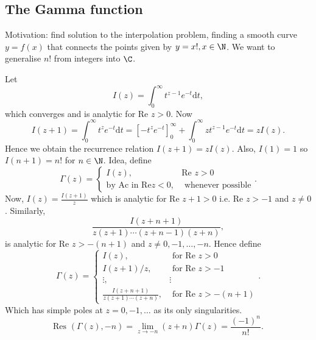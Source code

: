 \documentclass[a4paper]{article}
\begin{document}
\subsection{The Gamma function}
Motivation: find solution to the interpolation problem, finding a smooth curve $y = f(x)$ that connects the points given by $y = x!, x \in  \N$.  We want to generalise $n!$ from integers into  $\C$. 
\begin{center}
\end{center}
Let
\[
    I(z) = \int_0^{ \infty} t ^{z - 1} e^{ - t}\text{d}t
,\]
which converges and is analytic for $\text{Re }z > 0$. Now
\[
    I(z + 1) = \int_0^{\infty} t^{z } e^{ - t} \text{d}t = [-t^z e^{ - t}]_0^{\infty} + \int_0^{\infty} z t^{ z - 1} e^{ - t}\text{d}t = z I(z)
.\] 
Hence we obtain the recurrence relation $I (z+1 ) = z I (z)$. Also, $I(1) = 1$ so $I(n + 1) = n!$ for  $n \in  \N$. Idea, define
\[
    \Gamma (z) = \begin{cases}
        I(z),  &\text{Re } z > 0 \\
        \text{by Ac in Re} z < 0, & \text{ whenever possible} 
    \end{cases}
.\] 
Now, $I(z) = \frac{ I(z + 1)}{z}$ which is analytic for $\text{Re } z + 1 > 0$ i.e. $\text{Re } z > -1$ and $z \ne 0$. Similarly, 
\[
    \frac{ I ( z + n + 1)}{ z ( z + 1) \cdots ( z + n -1) ( z +n)}
,\]
is analytic for $\text{Re } z > - ( n + 1)$ and $z \ne  0 , -1, \ldots,  - n $. Hence define
 \[
     \Gamma ( z) = \begin{cases}
          I(z), & \text{ for Re } z > 0 \\
          I( z + 1) / z, & \text{ for Re } z > -1  \\
          \vdots , & \vdots \\
          \frac{I ( z + n + 1)}{z ( z + 1) \cdots ( z + n)}, & \text{ for Re } z > - ( n +1)
     \end{cases}
.\] 
Which has simple poles at $z = 0,  - 1, \ldots$ as its only singularities.
\[
    \text{Res } \left( \Gamma(z), -n  \right)  = \lim_{ z \to - n} ( z + n) \Gamma(z) = \frac{(-1)^{n}}{n!}
.\] 
\end{document}
